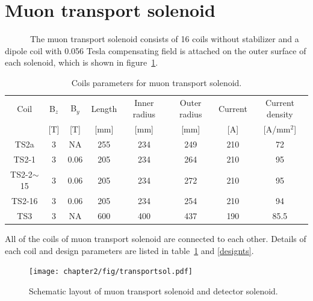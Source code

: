  \section{Muon transport solenoid}
~~~~~~The muon transport solenoid consists of 16 coils without stabilizer and a dipole coil with 0.056 Tesla compensating field is attached on the outer surface of each solenoid, which is shown in figure~\ref{transol}.
\begin{table}[H]
 \centering
 \begin{tabular}{cccccccc} \hline \hline
  Coil & B$_z$ & B$_y$ & Length & Inner radius & Outer radius & Current & Current density \\
   & [T] & [T] & [mm] & [mm] & [mm] & [A] & [A/mm$^2$] \\ \hline
  TS2a & 3 & NA & 255 & 234 & 249 & 210 & 72 \\
  TS2-1 & 3 & 0.06 & 205 & 234 & 264 & 210 & 95 \\
  TS2-2$\sim$15 & 3 & 0.06 & 205 & 234 & 272 & 210 & 95 \\
  TS2-16 & 3 & 0.06 & 205 & 234 & 254 & 210 & 94 \\
  TS3 & 3 & NA & 600 & 400 & 437 & 190 & 85.5 \\ \hline \hline
 \end{tabular}
 \caption{Coils parameters for muon transport solenoid.}
 \label{tscoil}
\end{table}
All of the coils of muon transport solenoid are connected to each other.
Details of each coil and design parameters are listed in table~\ref{tscoil} and \ref{designts}.
\begin{figure}[H]
 \centering
 \texttt{[image: chapter2/fig/transportsol.pdf]}
 \caption{Schematic layout of muon transport solenoid and detector solenoid.}
 \label{transol}
\end{figure}
